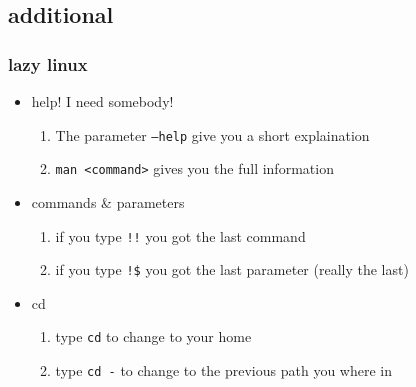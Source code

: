 \documentclass[handout]{beamer}
\newcommand{\code}[1]{\colorbox{lGray}{\texttt{#1}}}
\begin{document}
    \subsection{additional}
        \begin{frame}
			\frametitle{lazy linux}
			\begin{itemize}
                \item<1-> help! I need somebody!
                \begin{enumerate}
                    \item<2-> The parameter \code{--help} give you a short explaination
                    \item<3-> \code{man \textless command\textgreater} gives you the full information
                \end{enumerate}
                \item<4-> commands \& parameters
                \begin{enumerate}
                    \item<5-> if you type \code{!!} you got the last command 
                    \item<6-> if you type \code{!\$} you got the last parameter (really the last)
                \end{enumerate}
                \item<7-> cd
                \begin{enumerate}
                    \item<8-> type \code{cd} to change to your home
                    \item<9-> type \code{cd -} to change to the previous path you where in
                \end{enumerate}
            \end{itemize}
		\end{frame}
    
\end{document}
